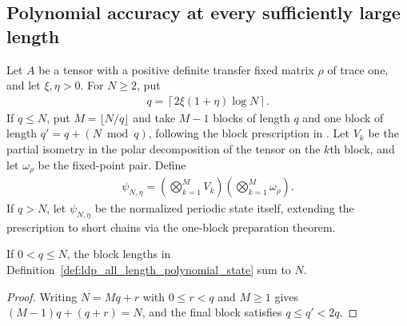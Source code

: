 \subsection{Polynomial accuracy at every sufficiently large length}
\label{subsec:ldp_all_length_polynomial_accuracy}

\begin{definition}%
    \label{def:ldp_all_length_polynomial_state}
    \leanok
    Let $A$ be a tensor with a positive definite transfer fixed matrix
    $\rho$ of trace one, and let $\xi,\eta>0$. For $N\geq2$, put
    \begin{align}
        q=\left\lceil2\xi(1+\eta)\log N\right\rceil.
        \label{eq:ldp_all_length_polynomial_block}
    \end{align}
    If $q\leq N$, put $M=\lfloor N/q\rfloor$ and take $M-1$ blocks of
    length $q$ and one block of length $q'=q+(N\bmod q)$, following the block prescription in
    \cite[Supplemental Material, proof of Theorem~1]{Malz2024Preparation}.
    Let $V_k$ be the partial isometry in the polar decomposition of
    the tensor on the $k$th block,
    and let $\omega_\rho$ be the fixed-point pair. Define
    \begin{align}
        \psi_{N,\eta}=\left(\bigotimes_{k=1}^{M}V_k\right)
        \left(\bigotimes_{k=1}^{M}\omega_\rho\right).
        \label{eq:ldp_all_length_polynomial_state}
    \end{align}
    If $q>N$, let $\psi_{N,\eta}$ be the normalized periodic state itself, extending the prescription to short chains via the
    one-block preparation theorem.
\end{definition}

\begin{lemma}%
    \label{lem:ldp_remainder_blocks_partition}
    \leanok
    If $0<q\leq N$, the block lengths in
    Definition~\ref{def:ldp_all_length_polynomial_state} sum to $N$.
\end{lemma}
\begin{proof}
    \leanok
    Writing $N=Mq+r$ with $0\leq r<q$ and $M\geq1$ gives
    $(M-1)q+(q+r)=N$, and the final block satisfies $q\leq q'<2q$.
\end{proof}

